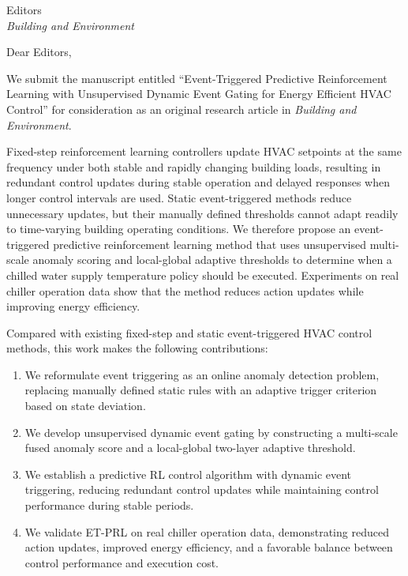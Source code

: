 \documentclass[11pt]{article}
\begin{document}
\thispagestyle{empty}

Editors\\
\textit{Building and Environment}

Dear Editors,

We submit the manuscript entitled ``Event-Triggered Predictive Reinforcement Learning with Unsupervised Dynamic Event Gating for Energy Efficient HVAC Control'' for consideration as an original research article in \textit{Building and Environment}.

Fixed-step reinforcement learning controllers update HVAC setpoints at the same frequency under both stable and rapidly changing building loads, resulting in redundant control updates during stable operation and delayed responses when longer control intervals are used. Static event-triggered methods reduce unnecessary updates, but their manually defined thresholds cannot adapt readily to time-varying building operating conditions. We therefore propose an event-triggered predictive reinforcement learning method that uses unsupervised multi-scale anomaly scoring and local-global adaptive thresholds to determine when a chilled water supply temperature policy should be executed. Experiments on real chiller operation data show that the method reduces action updates while improving energy efficiency.

Compared with existing fixed-step and static event-triggered HVAC control methods, this work makes the following contributions:

\begin{enumerate}
\setlength{\itemsep}{0.15em}
\setlength{\parsep}{0pt}
\setlength{\parskip}{0pt}
\setlength{\topsep}{0.25em}
\item We reformulate event triggering as an online anomaly detection problem, replacing manually defined static rules with an adaptive trigger criterion based on state deviation.
\item We develop unsupervised dynamic event gating by constructing a multi-scale fused anomaly score and a local-global two-layer adaptive threshold.
\item We establish a predictive RL control algorithm with dynamic event triggering, reducing redundant control updates while maintaining control performance during stable periods.
\item We validate ET-PRL on real chiller operation data, demonstrating reduced action updates, improved energy efficiency, and a favorable balance between control performance and execution cost.
\end{enumerate}
\end{document}
